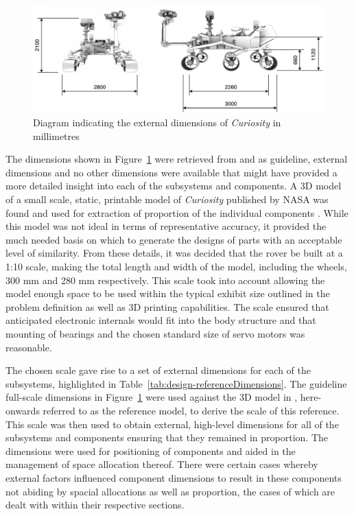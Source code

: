       \begin{figure}[h]
        \centering
        \includegraphics[width=0.9\linewidth]{figures/mechDesign-curiosityDimensions}
        \caption[Diagram indicating the external dimensions of \textit{Curiosity} in millimetres]{Diagram indicating the external dimensions of \textit{Curiosity} in millimetres \cite{nasa3D}}
        \label{fig:mechdesign-curiosityDimensions}
      \end{figure}
      
      The dimensions shown in Figure~\ref{fig:mechdesign-curiosityDimensions} were retrieved from \cite{nasajulypresskit} and \cite{roverThermal_2016} as guideline, external dimensions and no other dimensions were available that might have provided a more detailed insight into each of the subsystems and components. A 3D model of a small scale, static, printable model of \textit{Curiosity} published by NASA was found and used for extraction of proportion of the individual components \cite{nasa3Dprint}. While this model was not ideal in terms of representative accuracy, it provided the much needed basis on which to generate the designs of parts with an acceptable level of similarity. From these details, it was decided that the rover be built at a 1:10 scale, making the total length and width of the model, including the wheels, 300 mm and 280 mm respectively. This scale took into account allowing the model enough space to be used within the typical exhibit size outlined in the problem definition as well as 3D printing capabilities. The scale ensured that anticipated electronic internals would fit into the body structure and that mounting of bearings and the chosen standard size of servo motors was reasonable.
      
      The chosen scale gave rise to a set of external dimensions for each of the subsystems, highlighted in Table~\ref{tab:design-referenceDimensions}. The guideline full-scale dimensions in Figure~\ref{fig:mechdesign-curiosityDimensions} were used against the 3D model in \cite{nasa3Dprint}, here-onwards referred to as the reference model, to derive the scale of this reference. This scale was then used to obtain external, high-level dimensions for all of the subsystems and components ensuring that they remained in proportion. The dimensions were used for positioning of components and aided in the management of space allocation thereof. There were certain cases whereby external factors influenced component dimensions to result in these components not abiding by spacial allocations as well as proportion, the cases of which are dealt with within their respective sections.
            
